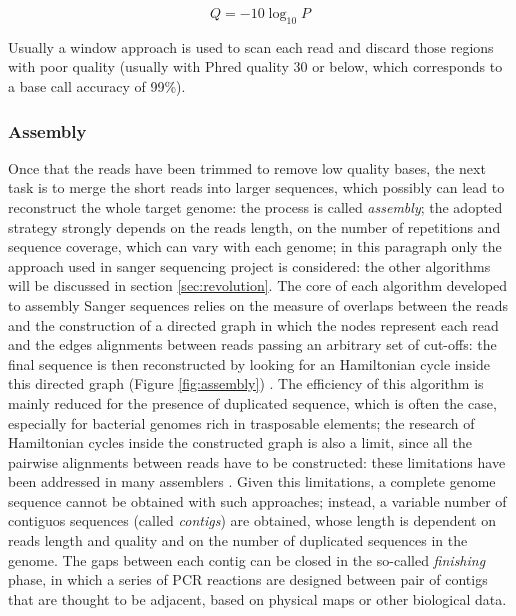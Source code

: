 \begin{equation}
\label{eq:phred}
Q = -10 \log_{10}P
\end{equation}

Usually a window approach is used to scan each read and discard those regions with poor quality (usually with Phred quality 30 or below, which corresponds to a base call accuracy of 99\%).

\subsubsection*{Assembly}
\label{sec:hamiltonian}
Once that the reads have been trimmed to remove low quality bases, the next task is to merge the short reads into larger sequences, which possibly can lead to reconstruct the whole target genome: the process is called \textit{assembly}; the adopted strategy strongly depends on the reads length, on the number of repetitions and sequence coverage, which can vary with each genome; in this paragraph only the approach used in sanger sequencing project is considered: the other algorithms will be discussed in section \ref{sec:revolution}. The core of each algorithm developed to assembly Sanger sequences relies on the measure of overlaps between the reads and the construction of a directed graph in which the nodes represent each read and the edges alignments between reads passing an arbitrary set of cut-offs: the final sequence is then reconstructed by looking for an Hamiltonian cycle inside this directed graph (Figure \ref{fig:assembly}) \cite{compeau2011apply}. The efficiency of this algorithm is mainly reduced for the presence of duplicated sequence, which is often the case, especially for bacterial genomes rich in trasposable elements; the research of Hamiltonian cycles inside the constructed graph is also a limit, since all the pairwise alignments between reads have to be constructed: these limitations have been addressed in many assemblers \cite{myers2000whole}\cite{batzoglou2002arachne}.
Given this limitations, a complete genome sequence cannot be obtained with such approaches; instead, a variable number of contiguos sequences (called \textit{contigs}) are obtained, whose length is dependent on reads length and quality and on the number of duplicated sequences in the genome. The gaps between each contig can be closed in the so-called \textit{finishing} phase, in which a series of PCR reactions are designed between pair of contigs that are thought to be adjacent, based on physical maps or other biological data.

